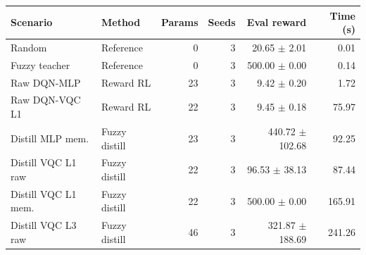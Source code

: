\scriptsize
\setlength{\tabcolsep}{3pt}
\begin{tabular}{@{}llrrrr@{}}
\hline
Scenario & Method & Params & Seeds & Eval reward & Time (s) \\
\hline
Random & Reference & 0 & 3 & 20.65 $\pm$ 2.01 & 0.01 \\
Fuzzy teacher & Reference & 0 & 3 & 500.00 $\pm$ 0.00 & 0.14 \\
Raw DQN-MLP & Reward RL & 23 & 3 & 9.42 $\pm$ 0.20 & 1.72 \\
Raw DQN-VQC L1 & Reward RL & 22 & 3 & 9.45 $\pm$ 0.18 & 75.97 \\
Distill MLP mem. & Fuzzy distill & 23 & 3 & 440.72 $\pm$ 102.68 & 92.25 \\
Distill VQC L1 raw & Fuzzy distill & 22 & 3 & 96.53 $\pm$ 38.13 & 87.44 \\
Distill VQC L1 mem. & Fuzzy distill & 22 & 3 & 500.00 $\pm$ 0.00 & 165.91 \\
Distill VQC L3 raw & Fuzzy distill & 46 & 3 & 321.87 $\pm$ 188.69 & 241.26 \\
\hline
\end{tabular}
